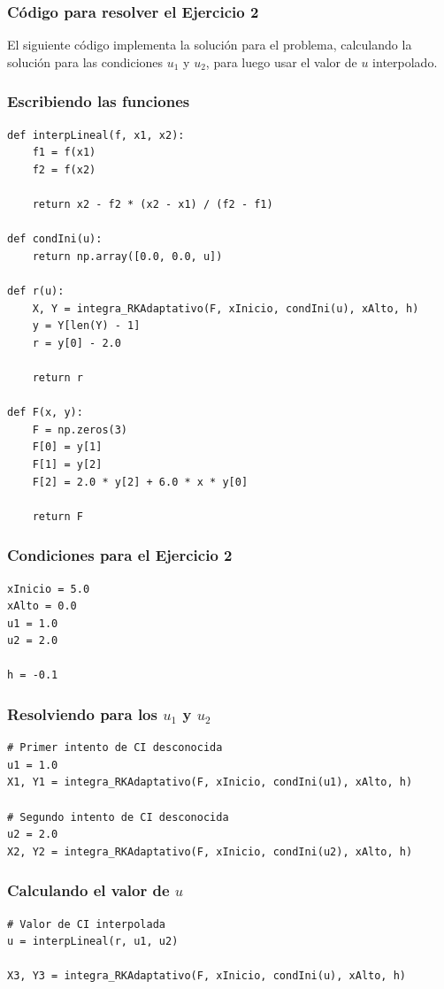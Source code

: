 \documentclass[12pt]{beamer}
\begin{document}
\begin{frame}
\frametitle{Código para resolver el Ejercicio 2}
El siguiente código implementa la solución para el problema, calculando la solución para las condiciones $u_{1}$ y $u_{2}$, para luego usar el valor de $u$ interpolado.
\end{frame}
\begin{frame}
\frametitle{Escribiendo las funciones}
\begin{lstlisting}[caption=Las funciones necesarias para el problema]
def interpLineal(f, x1, x2):
    f1 = f(x1)
    f2 = f(x2)

    return x2 - f2 * (x2 - x1) / (f2 - f1)

def condIni(u):
    return np.array([0.0, 0.0, u])

def r(u):
    X, Y = integra_RKAdaptativo(F, xInicio, condIni(u), xAlto, h)
    y = Y[len(Y) - 1]
    r = y[0] - 2.0
    
    return r

def F(x, y):
    F = np.zeros(3)
    F[0] = y[1]
    F[1] = y[2]
    F[2] = 2.0 * y[2] + 6.0 * x * y[0]
    
    return F
\end{lstlisting}
\end{frame}
\begin{frame}[fragile]
\frametitle{Condiciones para el Ejercicio 2}
\begin{lstlisting}[caption=Las condiciones para el ejercicio]
xInicio = 5.0
xAlto = 0.0
u1 = 1.0
u2 = 2.0

h = -0.1
\end{lstlisting}
\end{frame}
\begin{frame}[fragile]
\frametitle{Resolviendo para los $u_{1}$ y $u_{2}$}
\begin{lstlisting}[caption=Evaluando con los valores de prueba]
# Primer intento de CI desconocida
u1 = 1.0
X1, Y1 = integra_RKAdaptativo(F, xInicio, condIni(u1), xAlto, h)

# Segundo intento de CI desconocida
u2 = 2.0
X2, Y2 = integra_RKAdaptativo(F, xInicio, condIni(u2), xAlto, h)
\end{lstlisting}
\end{frame}
\begin{frame}[fragile]
\frametitle{Calculando el valor de $u$}
\begin{lstlisting}[caption=Calculando el valor interpolado de u]
# Valor de CI interpolada
u = interpLineal(r, u1, u2)

X3, Y3 = integra_RKAdaptativo(F, xInicio, condIni(u), xAlto, h)    
\end{lstlisting}
\end{frame}
\end{document}
